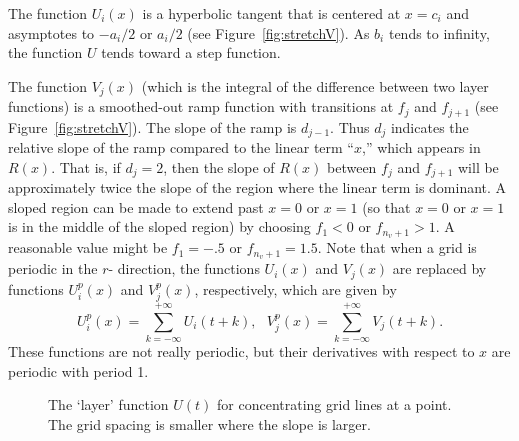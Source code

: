 \noindent
The function $U_i(x)$ is a hyperbolic tangent that is
centered at
$x=c_i$ and asymptotes to $-a_i/2$ or $a_i/2$ (see Figure~\ref{fig:stretchV}).
As $b_i$
tends to infinity,
the function $U$ tends toward a step function.

The function $V_j(x)$ (which is the integral of the difference between
two layer functions) is a smoothed-out ramp function with transitions
at $f_j$ and $f_{j+1}$ (see Figure~\ref{fig:stretchV}).  The slope of the
ramp is $d_{j-1}$.  Thus $d_j$ indicates the relative slope of the
ramp compared to the linear term ``$x$,'' which appears in $R(x)$.
That is, if $d_j=2$, then the slope of $R(x)$ between $f_j$ and
$f_{j+1}$ will be approximately twice the slope of the region where
the linear term is dominant.  A sloped region can be made to extend
past $x=0$ or $x=1$ (so that $x=0$ or $x=1$ is in the middle of the
sloped region) by choosing $f_1<0$ or $f_{n_v+1}>1$.  A reasonable
value might be $f_1=-.5$ or $f_{n_v+1}=1.5$.  Note that when a grid is
periodic in the $r$- direction, the functions $U_i(x)$ and $V_j(x)$
are replaced by functions $U^p_i(x)$ and $V^p_j(x)$, respectively,
which are given by
$$
 U^p_i(x) = \sum_{k = -\infty}^{+\infty} U_i(t+k),        ~~~
 V^p_j(x) =  \sum_{k = -\infty}^{+\infty} V_j(t+k).
$$
These functions are not really periodic, but their derivatives
with respect to $x$ are periodic with period 1.
\begin{figure}[hbt]
\newcommand{\figWidth}{12cm}
\newcommand{\trimfig}[2]{\trimFig{#1}{#2}{0.1}{.1}{.25}{.6}}
\begin{center}\small
  \caption{The `layer' function $U(t)$ for concentrating grid lines at a point. The grid spacing
      is smaller where the slope is larger.}  \label{fig:stretchU}
\end{center}
\end{figure}

